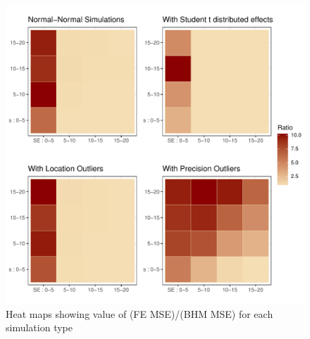 \documentclass[12pt]{article}
\begin{document}
\pagebreak




\begin{figure}
\centering
\includegraphics[scale=0.8]{heatmap_plots.pdf}
\caption{Heat maps showing value of (FE MSE)/(BHM MSE) for each simulation type}
\label{heatmaps}
\end{figure}
\end{document}
